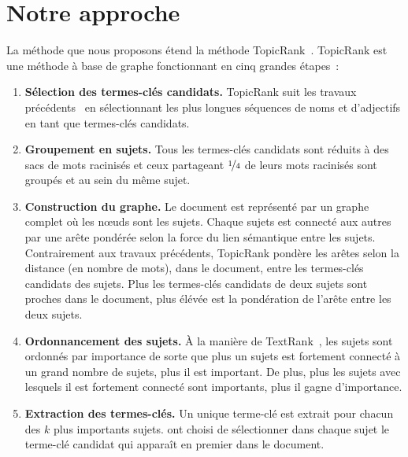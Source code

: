 \section{Notre approche}
\label{sec:main-domain_specific_keyphrase_annotation-topiccorank}
  La méthode que nous proposons étend la méthode
  TopicRank~\cite{bougouin2013topicrank}. TopicRank est une méthode à base de
  graphe fonctionnant en cinq grandes étapes~:
  \begin{enumerate}
    \item{\textbf{Sélection des termes-clés candidats.} TopicRank suit les
          travaux précédents~\cite{wan2008expandrank,hassan2010conundrums} en
          sélectionnant les plus longues séquences de noms et d'adjectifs en
          tant que termes-clés candidats.}
    \item{\textbf{Groupement en sujets.} Tous les termes-clés candidats sont
          réduits à des sacs de mots racinisés et ceux partageant
          $\unitfrac{1}{4}$ de leurs mots racinisés sont groupés et au sein du
          même sujet.}
    \item{\textbf{Construction du graphe.} Le document est représenté par un
          graphe complet où les n\oe{}uds sont les sujets. Chaque sujets est
          connecté aux autres par une arête pondérée selon la force du lien
          sémantique entre les sujets. Contrairement aux travaux précédents,
          TopicRank pondère les arêtes selon la distance (en nombre de mots),
          dans le document, entre les termes-clés candidats des sujets. Plus les
          termes-clés candidats de deux sujets sont proches dans le document,
          plus élévée est la pondération de l'arête entre les deux sujets.}
    \item{\textbf{Ordonnancement des sujets.} À la manière de
          TextRank~\cite{mihalcea2004textrank}, les sujets sont ordonnés par
          importance de sorte que plus un sujets est fortement connecté à un
          grand nombre de sujets, plus il est important. De plus, plus les
          sujets avec lesquels il est fortement connecté sont importants, plus
          il gagne d'importance.}
    \item{\textbf{Extraction des termes-clés.} Un unique terme-clé est extrait
          pour chacun des $k$ plus importants sujets.
           ont choisi de sélectionner dans chaque
          sujet le terme-clé candidat qui apparaît en premier dans le document.}
  \end{enumerate}
  
